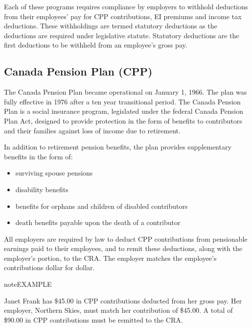 \documentclass[letterpaper,10pt,english]{sphinxmanual}
\begin{document}
\sphinxAtStartPar
Each of these programs requires compliance by employers to withhold deductions from their
employees’ pay for CPP contributions, EI premiums and income tax deductions. These
withholdings are termed statutory deductions as the deductions are required under legislative
statute. Statutory deductions are the first deductions to be withheld from an employee’s gross
pay.


\subsection{Canada Pension Plan (CPP)}
\label{\detokenize{2_compliance:canada-pension-plan-cpp}}
\sphinxAtStartPar
The Canada Pension Plan became operational on January 1, 1966. The plan was fully
effective in 1976 after a ten year transitional period.
The Canada Pension Plan is a social insurance program, legislated under the federal Canada
Pension Plan Act, designed to provide protection in the form of benefits to contributors and
their families against loss of income due to retirement.

\sphinxAtStartPar
In addition to retirement pension benefits, the plan provides supplementary benefits in the form of:
\begin{itemize}
\item {} 
\sphinxAtStartPar
surviving spouse pensions

\item {} 
\sphinxAtStartPar
disability benefits

\item {} 
\sphinxAtStartPar
benefits for orphans and children of disabled contributors

\item {} 
\sphinxAtStartPar
death benefits payable upon the death of a contributor

\end{itemize}

\sphinxAtStartPar
All employers are required by law to deduct CPP contributions from pensionable earnings
paid to their employees, and to remit these deductions, along with the employer’s portion, to
the CRA. The employer matches the employee’s contributions dollar for dollar.

\begin{sphinxadmonition}{note}{EXAMPLE}

\sphinxAtStartPar
Janet Frank has \$45.00 in CPP contributions deducted from her gross pay. Her employer,
Northern Skies, must match her contribution of \$45.00. A total of \$90.00 in CPP contributions must be remitted to the CRA.
\end{sphinxadmonition}
\end{document}
